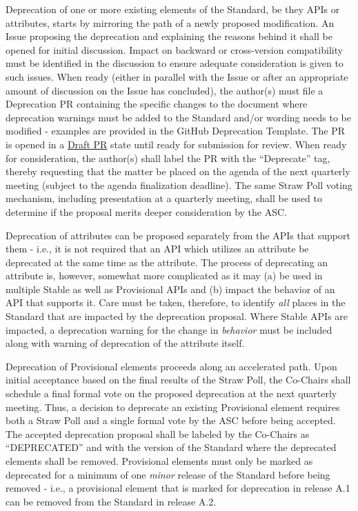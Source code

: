 \documentclass{article}
\begin{document}
Deprecation of one or more existing elements of the Standard, be they
APIs or attributes, starts by mirroring the path of a newly proposed
modification. An Issue proposing the deprecation and explaining the
reasons behind it shall be opened for initial discussion. Impact on
backward or cross-version compatibility must be identified in the
discussion to ensure adequate consideration is given to such issues.
When ready (either in parallel with the Issue or after an appropriate
amount of discussion on the Issue has concluded), the author(s) must
file a Deprecation PR containing the specific changes to the document
where deprecation warnings must be added to the Standard and/or wording
needs to be modified - examples are provided in the GitHub Deprecation
Template. The PR is opened in a
\href{https://github.blog/2019-02-14-introducing-draft-pull-requests/}{Draft
PR} state until ready for submission for review. When ready for
consideration, the author(s) shall label the PR with the ``Deprecate''
tag, thereby requesting that the matter be placed on the agenda of the
next quarterly meeting (subject to the agenda finalization deadline). The same
Straw Poll voting mechanism, including presentation at a
quarterly meeting, shall be used to determine if the proposal merits
deeper consideration by the ASC.

Deprecation of attributes can be proposed separately from the APIs that
support them - i.e., it is not required that an API which utilizes an
attribute be deprecated at the same time as the attribute. The process
of deprecating an attribute is, however, somewhat more complicated as it
may (a) be used in multiple Stable as well as Provisional APIs
and (b) impact the behavior of an API that supports it. Care must be
taken, therefore, to identify \emph{all} places in the Standard that are
impacted by the deprecation proposal. Where Stable APIs are
impacted, a deprecation warning for the change in \emph{behavior} must
be included along with warning of deprecation of the attribute itself.

Deprecation of Provisional elements proceeds along an accelerated
path. Upon initial acceptance based on the final results of the
Straw Poll, the Co-Chairs shall schedule a final formal
vote on the proposed deprecation at the next quarterly meeting. Thus, a
decision to deprecate an existing Provisional element requires both
a Straw Poll and a single formal vote by the ASC before being accepted.
The accepted deprecation proposal shall be labeled by the Co-Chairs as
``DEPRECATED'' and with the version of the Standard where the
deprecated elements shall be removed. Provisional elements must only
be marked as deprecated for a minimum of one \emph{minor} release of the
Standard before being removed - i.e., a provisional element that is
marked for deprecation in release A.1 can be removed from the Standard
in release A.2.
\end{document}
